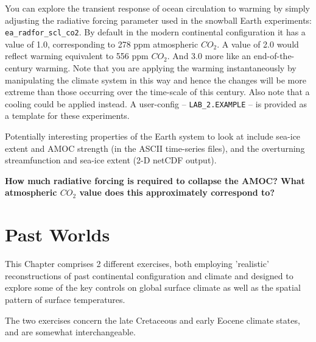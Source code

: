 \documentclass[11pt,fleqn]{book} %
\begin{document}
You can explore the transient response of ocean circulation to warming by simply adjusting the radiative forcing parameter used in the snowball Earth experiments: \texttt{ea\_radfor\_scl\_co2}. By default in the modern continental configuration it has a value of 1.0, corresponding to 278 ppm atmospheric \(CO_{2}\). A value of 2.0 would reflect warming equivalent to 556 ppm \(CO_{2}\). And 3.0 more like an end-of-the-century warming. Note that you are applying the warming instantaneously by manipulating the climate system in this way and hence the changes will be more extreme than those occurring over the time-scale of this century. Also note that a cooling could be applied instead. A user-config – \texttt{LAB\_2.EXAMPLE} – is provided as a template for these experiments.

Potentially interesting properties of the Earth system to look at include sea-ice extent and AMOC strength (in the ASCII time-series files), and the overturning streamfunction and sea-ice extent (2-D netCDF output).

\textbf{How much radiative forcing is required to collapse the AMOC? What atmospheric \(CO_{2}\) value does this approximately correspond to?
}


\cleardoublepage


\chapter{Past Worlds}

\hfill \break

\vspace{12mm}

\noindent This Chapter comprises 2 different exercises, both employing 'realistic' reconstructions of past continental configuration and climate and designed to explore some of the key controls on global surface climate as well as the spatial pattern of surface temperatures.

The two exercises concern the late Cretaceous and early Eocene climate states, and are somewhat interchangeable.
\end{document}

